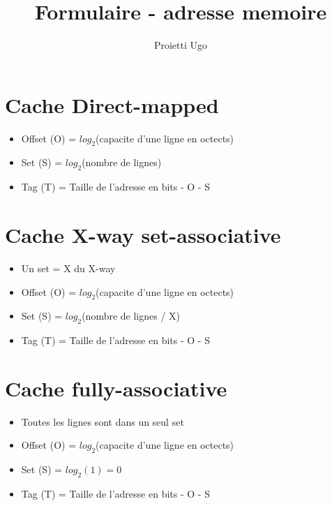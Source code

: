 \documentclass[12pt]{article}
\title{Formulaire - adresse memoire}
\author{Proietti Ugo}
\date{}
\begin{document}
\maketitle

\section{Cache Direct-mapped}
\begin{itemize}
    \item Offset (O) = $log_2$(capacite d'une ligne en octects)
    \item Set (S) = $log_2$(nombre de lignes)
    \item Tag (T) = Taille de l'adresse en bits - O - S
\end{itemize}

\section{Cache X-way set-associative}
\begin{itemize}
    \item Un set = X du X-way
    \item Offset (O) = $log_2$(capacite d'une ligne en octects)
    \item Set (S) = $log_2$(nombre de lignes / X)
    \item Tag (T) = Taille de l'adresse en bits - O - S
\end{itemize}

\section{Cache fully-associative}
\begin{itemize}
    \item Toutes les lignes sont dans un seul set
    \item Offset (O) = $log_2$(capacite d'une ligne en octects)
    \item Set (S) = $log_2(1) = 0$
    \item Tag (T) = Taille de l'adresse en bits - O - S
\end{itemize}
\end{document}
